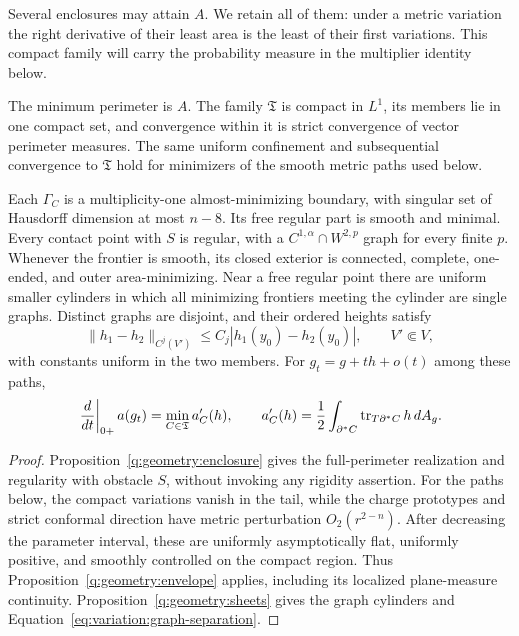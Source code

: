Several enclosures may attain $A$. We retain all of them: under a
metric variation the right derivative of their least area is the
least of their first variations. This compact family will carry the
probability measure in the multiplier identity below.

\begin{lemma}\label{lem:variation:envelope}
The minimum perimeter is $A$. The family $\mathfrak T$ is compact
in $L^1$, its members lie in one compact set, and convergence within
it is strict convergence of vector perimeter measures. The same
uniform confinement and subsequential convergence to $\mathfrak T$
hold for minimizers of the smooth metric paths used below.

Each $\Gamma_C$ is a multiplicity-one almost-minimizing boundary,
with singular set of Hausdorff dimension at most $n-8$. Its free
regular part is smooth and minimal. Every contact point with $S$ is
regular, with a $C^{1,\alpha}\cap W^{2,p}$ graph for every finite $p$.
Whenever the frontier is smooth, its closed exterior is connected,
complete, one-ended, and outer area-minimizing. Near a free regular
point there are uniform smaller cylinders in which all minimizing
frontiers meeting the cylinder are single graphs. Distinct graphs
are disjoint, and their ordered heights satisfy
\begin{equation}\label{eq:variation:graph-separation}
 \|h_1-h_2\|_{C^j(V')}
 \le C_j|h_1(y_0)-h_2(y_0)|,\qquad V'\Subset V,
\end{equation}
with constants uniform in the two members. For $g_t=g+th+o(t)$
among these paths,
\begin{equation}\label{eq:variation:envelope-derivative}
 \left.\frac{d}{dt}\right|_{0+}a(g_t)
 =\min_{C\in\mathfrak T}a'_C(h),\qquad
 a'_C(h)=\frac12\int_{\partial^*C}\operatorname{tr}_{T\partial^*C}h\,dA_g.
\end{equation}
\end{lemma}

\begin{proof}
Proposition~\ref{q:geometry:enclosure} gives the full-perimeter
realization and regularity with obstacle $S$, without invoking any
rigidity assertion. For the paths below, the compact variations vanish
in the tail, while the charge prototypes and strict conformal
direction have metric perturbation $O_2(r^{2-n})$. After decreasing
the parameter interval, these are uniformly asymptotically flat,
uniformly positive, and smoothly controlled on the compact region.
Thus Proposition~\ref{q:geometry:envelope} applies, including its
localized plane-measure continuity. Proposition~\ref{q:geometry:sheets}
gives the graph cylinders and Equation~\eqref{eq:variation:graph-separation}.
\end{proof}
